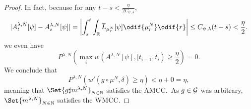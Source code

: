 \begin{proof}
  In fact, because for any \( t - s < \frac{\eta}{2C_{\psi, \lambda}} \),
  \begin{equation}
    \abs{ A_t^{\lambda, N}[\psi] - A_s^{\lambda, N}[\psi] }
    = \abs*{ \int_s^t \int_{\potspace} \ol{L}_{\mu_r^N}[\psi] \odif{\mu_r^N} \odif{r} }
    \leq C_{\psi,\lambda} (t - s)
    < \frac{\eta}{2}.
  \end{equation}
  we even have
  \begin{equation}
    P^{\lambda, N}( \max_i w(A^{\lambda, N}[\psi], [t_{i-1}, t_i) \geq \frac{\eta}{2}) = 0.
  \end{equation}
  We conclude that
  \begin{equation}
    P^{\lambda, N} (w'(g \circ \mu^N, \delta) \geq \eta)
    < \eta + 0 = \eta,
  \end{equation}
  meaning that \( \Set{g \sharp \lawmu^{\lambda,N}}_{N \in \bN} \) satisfies the AMCC.\
  As \( g \in \mathcal{G} \) was arbitrary, \( \Set{\lawmu^{\lambda,N}}_{N \in \bN} \) satisfies the WMCC.

\end{proof}